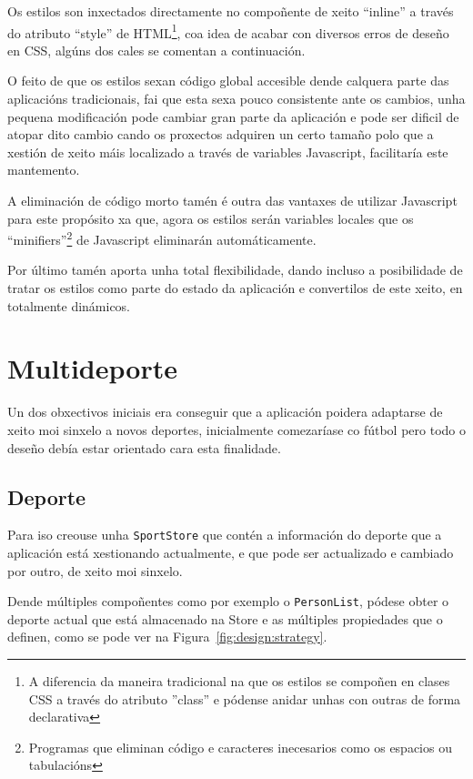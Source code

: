     Os estilos son inxectados directamente no compoñente de xeito ``inline'' a 
través do atributo ``style'' de HTML\footnote{A diferencia da maneira 
tradicional na que os estilos se compoñen en clases CSS a través do atributo 
''class'' e pódense anidar unhas con outras de forma declarativa}, coa idea de 
acabar con diversos erros de deseño en CSS, algúns dos cales se comentan a 
continuación.

    O feito de que os estilos sexan código global accesible dende calquera 
parte das aplicacións tradicionais, fai que esta sexa pouco consistente ante os 
cambios, unha pequena modificación pode cambiar gran parte da aplicación e pode 
ser dificil de atopar dito cambio cando os proxectos adquiren un certo 
tamaño polo que a xestión de xeito máis localizado a través de variables 
Javascript, facilitaría este mantemento.

    A eliminación de código morto tamén é outra das vantaxes de utilizar 
Javascript para este propósito xa que, agora os estilos serán variables locales 
que os ``minifiers''\footnote{Programas que eliminan código e 
caracteres inecesarios como os espacios ou tabulacións} de Javascript 
eliminarán automáticamente.

    Por último tamén aporta unha total flexibilidade, dando incluso a 
posibilidade de tratar os estilos como parte do estado da aplicación e 
convertilos de este xeito, en totalmente dinámicos.

  \section{Multideporte}
  Un dos obxectivos iniciais era conseguir que a aplicación poidera adaptarse 
de xeito moi sinxelo a novos deportes, inicialmente comezaríase co fútbol pero 
todo o deseño debía estar orientado cara esta finalidade.

  \subsection{Deporte}
  Para iso creouse unha \lstinline{SportStore} que contén a información do 
deporte 
que a aplicación está xestionando actualmente, e que pode ser actualizado e 
cambiado por outro, de xeito moi sinxelo.

  Dende múltiples compoñentes como por exemplo o \lstinline{PersonList}, pódese 
obter o deporte actual que está almacenado na Store e as múltiples propiedades 
que o definen, como se pode ver na Figura~\ref{fig:design:strategy}.

